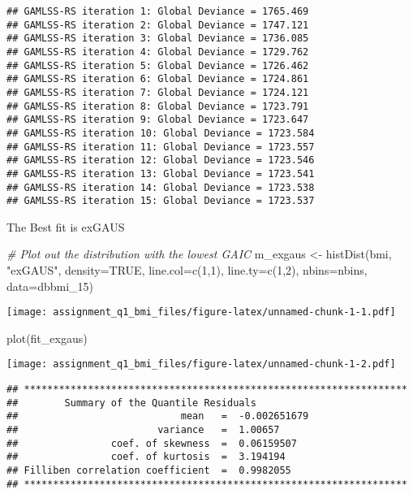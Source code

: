\documentclass[
]{article}
\newenvironment{Shaded}{\begin{snugshade}}{\end{snugshade}}
\newcommand{\AttributeTok}[1]{\textcolor[rgb]{0.77,0.63,0.00}{#1}}
\newcommand{\CommentTok}[1]{\textcolor[rgb]{0.56,0.35,0.01}{\textit{#1}}}
\newcommand{\ConstantTok}[1]{\textcolor[rgb]{0.00,0.00,0.00}{#1}}
\newcommand{\DecValTok}[1]{\textcolor[rgb]{0.00,0.00,0.81}{#1}}
\newcommand{\FunctionTok}[1]{\textcolor[rgb]{0.00,0.00,0.00}{#1}}
\newcommand{\NormalTok}[1]{#1}
\newcommand{\OtherTok}[1]{\textcolor[rgb]{0.56,0.35,0.01}{#1}}
\newcommand{\StringTok}[1]{\textcolor[rgb]{0.31,0.60,0.02}{#1}}
\begin{document}
\begin{verbatim}
## GAMLSS-RS iteration 1: Global Deviance = 1765.469 
## GAMLSS-RS iteration 2: Global Deviance = 1747.121 
## GAMLSS-RS iteration 3: Global Deviance = 1736.085 
## GAMLSS-RS iteration 4: Global Deviance = 1729.762 
## GAMLSS-RS iteration 5: Global Deviance = 1726.462 
## GAMLSS-RS iteration 6: Global Deviance = 1724.861 
## GAMLSS-RS iteration 7: Global Deviance = 1724.121 
## GAMLSS-RS iteration 8: Global Deviance = 1723.791 
## GAMLSS-RS iteration 9: Global Deviance = 1723.647 
## GAMLSS-RS iteration 10: Global Deviance = 1723.584 
## GAMLSS-RS iteration 11: Global Deviance = 1723.557 
## GAMLSS-RS iteration 12: Global Deviance = 1723.546 
## GAMLSS-RS iteration 13: Global Deviance = 1723.541 
## GAMLSS-RS iteration 14: Global Deviance = 1723.538 
## GAMLSS-RS iteration 15: Global Deviance = 1723.537
\end{verbatim}

The Best fit is exGAUS

\begin{Shaded}
\begin{Highlighting}[]
\CommentTok{\# Plot out the distribution with the lowest GAIC}
\NormalTok{m\_exgaus }\OtherTok{\textless{}{-}} \FunctionTok{histDist}\NormalTok{(bmi, }\StringTok{"exGAUS"}\NormalTok{, }\AttributeTok{density=}\ConstantTok{TRUE}\NormalTok{, }\AttributeTok{line.col=}\FunctionTok{c}\NormalTok{(}\DecValTok{1}\NormalTok{,}\DecValTok{1}\NormalTok{), }\AttributeTok{line.ty=}\FunctionTok{c}\NormalTok{(}\DecValTok{1}\NormalTok{,}\DecValTok{2}\NormalTok{), }\AttributeTok{nbins=}\NormalTok{nbins, }\AttributeTok{data=}\NormalTok{dbbmi\_15)}
\end{Highlighting}
\end{Shaded}

\texttt{[image: assignment\_q1\_bmi\_files/figure-latex/unnamed-chunk-1-1.pdf]}

\begin{Shaded}
\begin{Highlighting}[]
\FunctionTok{plot}\NormalTok{(fit\_exgaus)}
\end{Highlighting}
\end{Shaded}

\texttt{[image: assignment\_q1\_bmi\_files/figure-latex/unnamed-chunk-1-2.pdf]}

\begin{verbatim}
## ******************************************************************
##        Summary of the Quantile Residuals
##                            mean   =  -0.002651679 
##                        variance   =  1.00657 
##                coef. of skewness  =  0.06159507 
##                coef. of kurtosis  =  3.194194 
## Filliben correlation coefficient  =  0.9982055 
## ******************************************************************
\end{verbatim}
\end{document}
